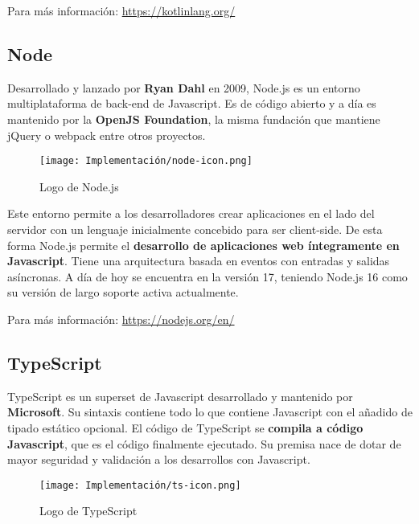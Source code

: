 Para más información: \href{https://kotlinlang.org/}{https://kotlinlang.org/}

\subsection{Node}
\label{lib:node}

Desarrollado y lanzado por \textbf{Ryan Dahl} en 2009, Node.js es un entorno multiplataforma de back-end de Javascript. Es de código abierto y a día es mantenido por la \textbf{OpenJS Foundation}, la misma fundación que mantiene jQuery o webpack entre otros proyectos.

\begin{wrapfigure}[6]{r}{0.2\textwidth}
    \vspace{-5pt}
    \centering
    \texttt{[image: Implementación/node-icon.png]}
    \vspace{-10pt}
    \caption{Logo de Node.js}
\end{wrapfigure}

Este entorno permite a los desarrolladores crear aplicaciones en el lado del servidor con un lenguaje inicialmente concebido para ser client-side. De esta forma Node.js permite el \textbf{desarrollo de aplicaciones web íntegramente en Javascript}. Tiene una arquitectura basada en eventos con entradas y salidas asíncronas. A día de hoy se encuentra en la versión 17, teniendo Node.js 16 como su versión de largo soporte activa actualmente.

Para más información: \href{https://nodejs.org/en/}{https://nodejs.org/en/}

\subsection{TypeScript}
\label{lib:typescript}

TypeScript es un superset de Javascript desarrollado y mantenido por \textbf{Microsoft}. Su sintaxis contiene todo lo que contiene Javascript con el añadido de tipado estático opcional. El código de TypeScript se \textbf{compila a código Javascript}, que es el código finalmente ejecutado. Su premisa nace de dotar de mayor seguridad y validación a los desarrollos con Javascript.

\begin{wrapfigure}[6]{l}{0.2\textwidth}
    \vspace{-25pt}
    \centering
    \texttt{[image: Implementación/ts-icon.png]}
    \vspace{-10pt}
    \caption{Logo de TypeScript}
\end{wrapfigure}

